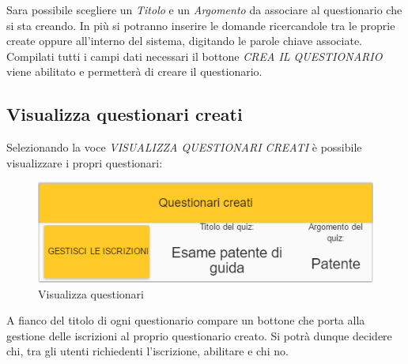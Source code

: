 Sara possibile scegliere un \textit{Titolo} e un \textit{Argomento} da associare al questionario che si sta creando. In più si potranno inserire le domande ricercandole tra le proprie create oppure all'interno del sistema, digitando le parole chiave associate. Compilati tutti i campi dati necessari il bottone \textit{CREA IL QUESTIONARIO} viene abilitato e permetterà di creare il questionario. 

\subsection{Visualizza questionari creati}
Selezionando la voce \textit{VISUALIZZA QUESTIONARI CREATI} è possibile visualizzare i propri questionari:

\label{VisualizzaQuestionari}
\begin{figure}[ht]
	\centering
	\includegraphics[scale=0.55]{img/visualizza_questionari.png}
	\caption{Visualizza questionari}
\end{figure}
\FloatBarrier

A fianco del titolo di ogni questionario compare un bottone che porta alla gestione delle iscrizioni al proprio questionario creato. Si potrà dunque decidere chi, tra gli utenti richiedenti l'iscrizione, abilitare e chi no.
